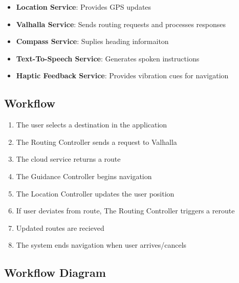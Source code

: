 \documentclass{article}
\begin{document}
\begin{itemize}
	\item \textbf{Location Service}: Provides GPS updates
	\item \textbf{Valhalla Service}: Sends routing requests and processes responses
	\item \textbf{Compass Service}: Suplies heading informaiton
	\item \textbf{Text-To-Speech Service}: Generates spoken instructions
	\item \textbf{Haptic Feedback Service}: Provides vibration cues for navigation
\end{itemize}

\subsection{Workflow}
\begin{enumerate}
	\item The user selects a destination in the application
	\item The Routing Controller sends a request to Valhalla
	\item The cloud service returns a route
	\item The Guidance Controller begins navigation
	\item The Location Controller updates the user position
	\item If user deviates from route, The Routing Controller triggers a reroute
	\item Updated routes are recieved
	\item The system ends navigation when user arrives/cancels
\end{enumerate}

\subsection{Workflow Diagram}
\end{document}

